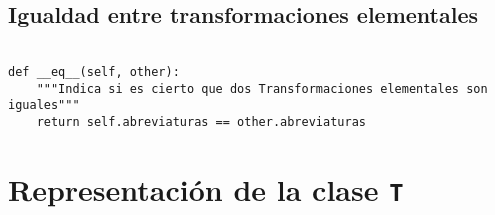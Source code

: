 \documentclass[11pt]{report}
\begin{document}
\subsection{Igualdad entre transformaciones elementales}
\label{sec:org9970228}

\begin{verbatim}

def __eq__(self, other):
    """Indica si es cierto que dos Transformaciones elementales son iguales"""
    return self.abreviaturas == other.abreviaturas

\end{verbatim}

\section{Representación de la clase \texttt{T}}
\label{sec:org81d328e}
\end{document}
